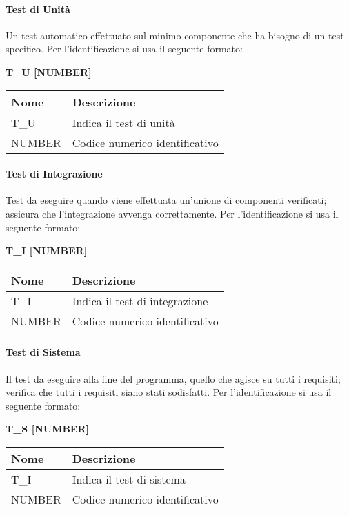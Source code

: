 \paragraph{Test di Unità} \hfill \break
Un test automatico effettuato sul minimo componente che ha bisogno di un test specifico.\newline
Per l’identificazione si usa il seguente formato:
\begin{center}
    \textbf{T\_U [NUMBER]}
\end{center}
\renewcommand{\arraystretch}{1.8} 
 \begin{tabular}{ |m{7em}|m{30em}| }
        \hline 
        \textbf{Nome} & \textbf{Descrizione} \\
        \hline
            T\_U & Indica il test di unità \\
        \hline
            NUMBER & Codice numerico identificativo \\
        \hline
 \end{tabular}

\paragraph{Test di Integrazione}  \hfill \break
Test da eseguire quando viene effettuata un'unione di componenti verificati; assicura che l’integrazione 
avvenga correttamente.
Per l’identificazione si usa il seguente formato:
\begin{center}
    \textbf{T\_I [NUMBER]}
\end{center}
\renewcommand{\arraystretch}{1.8} 
 \begin{tabular}{ |m{7em}|m{30em}| }
        \hline
        \textbf{Nome} & \textbf{Descrizione} \\
        \hline
            T\_I & Indica il test di integrazione \\
        \hline
            NUMBER & Codice numerico identificativo \\
        \hline
 \end{tabular}

\paragraph{Test di Sistema}  \hfill \break
Il test da eseguire alla fine del programma, quello che agisce su tutti i requisiti; verifica che tutti i 
requisiti siano stati sodisfatti.
Per l’identificazione si usa il seguente formato:
\begin{center}
    \textbf{T\_S [NUMBER]}
\end{center}
\renewcommand{\arraystretch}{1.8} 
 \begin{tabular}{ |m{7em}|m{30em}| }
        \hline
        \textbf{Nome} & \textbf{Descrizione} \\
        \hline
            T\_I & Indica il test di sistema \\
        \hline
            NUMBER & Codice numerico identificativo \\
        \hline
 \end{tabular}

